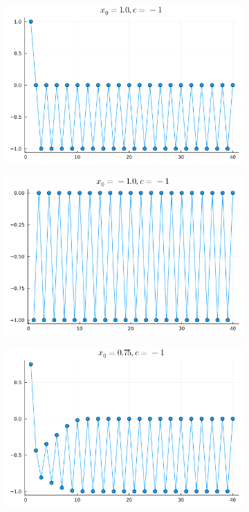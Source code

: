 \documentclass{article}
\def\v{0.47}
\begin{document}
\begin{figure}[h!]
\begin{subfigure}[b]{\v\linewidth}
		\end{subfigure}
		\begin{subfigure}[b]{\v\linewidth}
			\includegraphics[width=\linewidth]{graphs/4.png}
		\end{subfigure}
		\begin{subfigure}[b]{\v\linewidth}
			\includegraphics[width=\linewidth]{graphs/5.png}
		\end{subfigure}
		\begin{subfigure}[b]{\v\linewidth}
			\includegraphics[width=\linewidth]{graphs/6.png}

\end{subfigure}
\end{figure}
\end{document}
